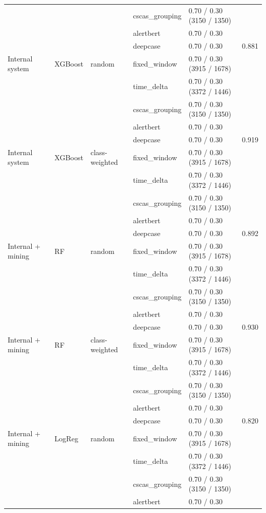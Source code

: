 \begin{table}[htbp]
{\begin{tabular}{lllllc}
 &  &  & cscas\_grouping & 0.70 / 0.30 (3150 / 1350) &  \\
 &  &  & alertbert & 0.70 / 0.30 &  \\
 &  &  & deepcase & 0.70 / 0.30 & 0.881 \\
\addlinespace
Internal system & XGBoost & random & fixed\_window & 0.70 / 0.30 (3915 / 1678) &  \\
 &  &  & time\_delta & 0.70 / 0.30 (3372 / 1446) &  \\
 &  &  & cscas\_grouping & 0.70 / 0.30 (3150 / 1350) &  \\
 &  &  & alertbert & 0.70 / 0.30 &  \\
 &  &  & deepcase & 0.70 / 0.30 & 0.919 \\
\addlinespace
Internal system & XGBoost & class-weighted & fixed\_window & 0.70 / 0.30 (3915 / 1678) &  \\
 &  &  & time\_delta & 0.70 / 0.30 (3372 / 1446) &  \\
 &  &  & cscas\_grouping & 0.70 / 0.30 (3150 / 1350) &  \\
 &  &  & alertbert & 0.70 / 0.30 &  \\
 &  &  & deepcase & 0.70 / 0.30 & 0.892 \\
\midrule
Internal + mining & RF & random & fixed\_window & 0.70 / 0.30 (3915 / 1678) &  \\
 &  &  & time\_delta & 0.70 / 0.30 (3372 / 1446) &  \\
 &  &  & cscas\_grouping & 0.70 / 0.30 (3150 / 1350) &  \\
 &  &  & alertbert & 0.70 / 0.30 &  \\
 &  &  & deepcase & 0.70 / 0.30 & 0.930 \\
\addlinespace
Internal + mining & RF & class-weighted & fixed\_window & 0.70 / 0.30 (3915 / 1678) &  \\
 &  &  & time\_delta & 0.70 / 0.30 (3372 / 1446) &  \\
 &  &  & cscas\_grouping & 0.70 / 0.30 (3150 / 1350) &  \\
 &  &  & alertbert & 0.70 / 0.30 &  \\
 &  &  & deepcase & 0.70 / 0.30 & 0.820 \\
\addlinespace
Internal + mining & LogReg & random & fixed\_window & 0.70 / 0.30 (3915 / 1678) &  \\
 &  &  & time\_delta & 0.70 / 0.30 (3372 / 1446) &  \\
 &  &  & cscas\_grouping & 0.70 / 0.30 (3150 / 1350) &  \\
 &  &  & alertbert & 0.70 / 0.30 &  \\

\end{tabular}}
\end{table}
